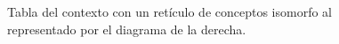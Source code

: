 \documentclass[oneside,openright,titlepage,numbers=noenddot,openany,headinclude,footinclude=true,
cleardoublepage=empty,abstractoff,BCOR=5mm,paper=a4,fontsize=12pt,main=spanish]{scrreprt}
\begin{document}
\begin{figure}[H]
\centering
{}
\caption{Tabla del contexto con un retículo de conceptos isomorfo al representado por el diagrama de la derecha.}
\label{tab:my-table}
\end{figure}
\end{document}
